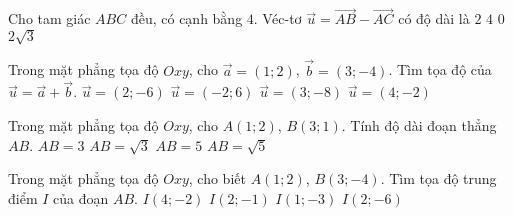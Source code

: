 \begin{ex}%
Cho tam giác $ABC$ đều, có cạnh bằng $4$. Véc-tơ $\overrightarrow{u}=\overrightarrow{AB}-\overrightarrow{AC}$ có độ dài là
		\choice
	{$2$}
	{\True $4$}
	{$0$}
	{$2\sqrt{3}$}
\end{ex}

\begin{ex}%
Trong mặt phẳng tọa độ $Oxy$, cho $\overrightarrow{a}=(1;2)$, $\overrightarrow{b}=(3;-4)$. Tìm tọa độ của $\overrightarrow{u}=\overrightarrow{a}+\overrightarrow{b}$.
		\choice
	{$\overrightarrow{u}=(2;-6)$}
	{$\overrightarrow{u}=(-2;6)$}
	{$\overrightarrow{u}=(3;-8)$}
	{\True $\overrightarrow{u}=(4;-2)$}
\end{ex}

\begin{ex}%
Trong mặt phẳng tọa độ $Oxy$, cho $A(1;2)$, $B(3;1)$. Tính độ dài đoạn thẳng $AB$.
		\choice
	{$AB=3$}
	{$AB=\sqrt{3}$}
	{$AB=5$}
	{\True $AB=\sqrt{5}$}
\end{ex}

\begin{ex}%
Trong mặt phẳng tọa độ $Oxy$, cho biết $A(1;2)$, $B(3;-4)$. Tìm tọa độ trung điểm $I$ của đoạn $AB$.
		\choice
	{$I(4;-2)$}
	{\True $I(2;-1)$}
	{$I(1;-3)$}
	{$I(2;-6)$}
\end{ex}

